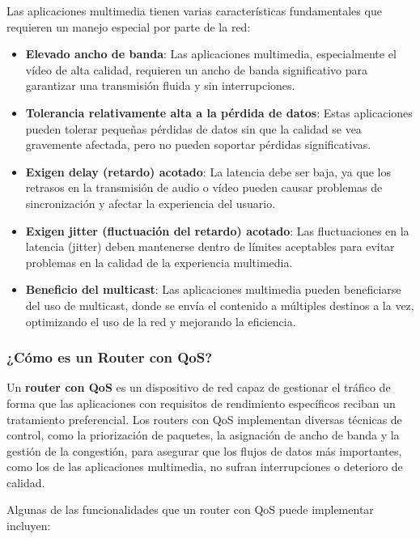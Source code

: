 \documentclass[a4paper,12pt]{article}
\begin{document}
Las aplicaciones multimedia tienen varias características fundamentales que requieren un manejo especial por parte de la red:

\begin{itemize}
    \item \textbf{Elevado ancho de banda}: Las aplicaciones multimedia, especialmente el vídeo de alta calidad, requieren un ancho de banda significativo para garantizar una transmisión fluida y sin interrupciones.
    \item \textbf{Tolerancia relativamente alta a la pérdida de datos}: Estas aplicaciones pueden tolerar pequeñas pérdidas de datos sin que la calidad se vea gravemente afectada, pero no pueden soportar pérdidas significativas.
    \item \textbf{Exigen delay (retardo) acotado}: La latencia debe ser baja, ya que los retrasos en la transmisión de audio o vídeo pueden causar problemas de sincronización y afectar la experiencia del usuario.
    \item \textbf{Exigen jitter (fluctuación del retardo) acotado}: Las fluctuaciones en la latencia (jitter) deben mantenerse dentro de límites aceptables para evitar problemas en la calidad de la experiencia multimedia.
    \item \textbf{Beneficio del multicast}: Las aplicaciones multimedia pueden beneficiarse del uso de multicast, donde se envía el contenido a múltiples destinos a la vez, optimizando el uso de la red y mejorando la eficiencia.
\end{itemize}

\subsubsection{¿Cómo es un Router con QoS?}

Un \textbf{router con QoS} es un dispositivo de red capaz de gestionar el tráfico de forma que las aplicaciones con requisitos de rendimiento específicos reciban un tratamiento preferencial. Los routers con QoS implementan diversas técnicas de control, como la priorización de paquetes, la asignación de ancho de banda y la gestión de la congestión, para asegurar que los flujos de datos más importantes, como los de las aplicaciones multimedia, no sufran interrupciones o deterioro de calidad.

Algunas de las funcionalidades que un router con QoS puede implementar incluyen:
\end{document}

